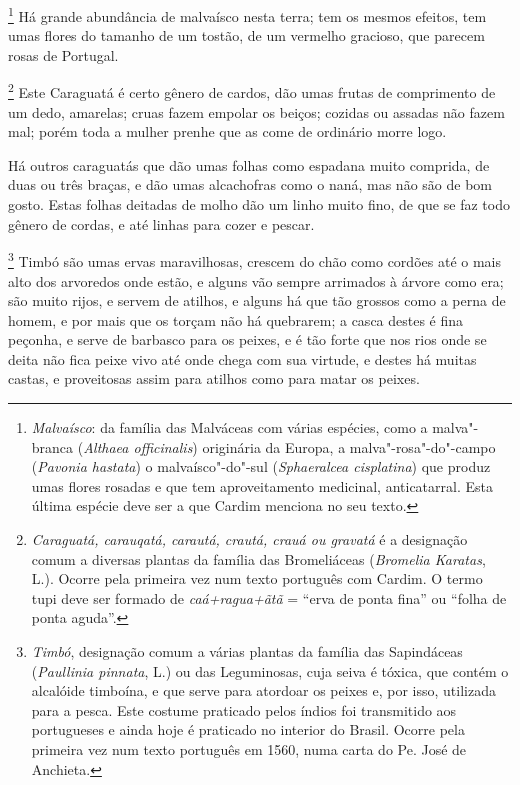 \footnote{ \textit{Malvaísco}: da família das
Malváceas com várias espécies, como a malva"-branca (\textit{Althaea
officinalis}) originária da Europa, a malva"-rosa"-do"-campo 
(\textit{Pavonia hastata}) o malvaísco"-do"-sul (\textit{Sphaeralcea
cisplatina}) que produz umas flores rosadas e que tem aproveitamento
medicinal, anticatarral. Esta última espécie deve ser a que Cardim
menciona no seu texto.} Há grande abundância de malvaísco
nesta terra; tem os mesmos efeitos, tem umas flores do tamanho de um
tostão, de um vermelho gracioso, que parecem rosas de Portugal.

\footnote{ \textit{Caraguatá, carauqatá, carautá,
crautá, crauá ou gravatá} é a designação comum a diversas plantas da
família das Bromeliáceas (\textit{Bromelia Karatas}, L.). Ocorre pela
primeira vez num texto português com Cardim. O termo tupi deve ser
formado de \textit{caá+ragua+ãtã} = ``erva de ponta fina'' ou ``folha de
ponta aguda''.} Este Caraguatá é certo gênero de cardos,
dão umas frutas de comprimento de um dedo, amarelas; cruas fazem
empolar os beiços; cozidas ou assadas não fazem mal; porém toda a
mulher prenhe que as come de ordinário morre logo.

 Há outros caraguatás que dão umas folhas como espadana muito comprida,
de duas ou três braças, e dão umas alcachofras como o naná, mas não são
de bom gosto. Estas folhas deitadas de molho dão um linho muito fino,
de que se faz todo gênero de cordas, e até linhas para cozer e pescar. 

\footnote{ \textit{Timbó}, designação comum a várias
plantas da família das Sapindáceas (\textit{Paullinia pinnata}, L.) 
ou das Leguminosas, cuja seiva é tóxica, que contém o
alcalóide timboína, e que serve para atordoar os peixes e, por isso,
utilizada para a pesca. Este costume praticado pelos índios foi
transmitido aos portugueses e ainda hoje é praticado no interior do
Brasil. Ocorre pela primeira vez num texto português em 1560, numa
carta do Pe. José de Anchieta.} Timbó são umas
ervas maravilhosas, crescem do chão como cordões até o mais alto dos
arvoredos onde estão, e alguns vão sempre arrimados à árvore como era;
são muito rijos, e servem de atilhos, e alguns há que tão grossos como a
perna de homem, e por mais que os torçam não há quebrarem; a casca
destes é fina peçonha, e serve de barbasco para os peixes, e é tão
forte que nos rios onde se deita não fica peixe vivo até onde chega
com sua virtude, e destes há muitas castas, e proveitosas assim para
atilhos como para matar os peixes. 


